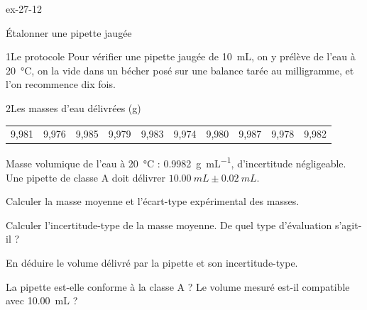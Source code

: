 \begin{blocLivre}{ex-27-12}
\begin{exercice}[3]{Étalonner une pipette jaugée}
\begin{docu}{1}{Le protocole}
Pour vérifier une pipette jaugée de \qty{10}{mL}, on y prélève de l'eau à \qty{20}{\degreeCelsius}, on la vide dans un bécher posé sur une
balance tarée au milligramme, et l'on recommence dix fois.
\end{docu}
\begin{docu}{2}{Les masses d'eau délivrées (g)}
\begin{tabular}{cccccccccc}
9,981 & 9,976 & 9,985 & 9,979 & 9,983 & 9,974 & 9,980 & 9,987 & 9,978 & 9,982 \\
\end{tabular}
\end{docu}
\begin{donnees}
Masse volumique de l'eau à \qty{20}{\degreeCelsius} : \qty{0,9982}{g.mL^{-1}}, d'incertitude négligeable. Une pipette de classe A doit délivrer
$\qty{10,00}{mL}\pm\qty{0,02}{mL}$.
\end{donnees}
\begin{questions}
\item Calculer la masse moyenne et l'écart-type expérimental des masses.
\item Calculer l'incertitude-type de la masse moyenne. De quel type d'évaluation s'agit-il ?
\item En déduire le volume délivré par la pipette et son incertitude-type.
\item \initiative La pipette est-elle conforme à la classe A ? Le volume mesuré est-il compatible avec \qty{10,00}{mL} ?
\end{questions}
\end{exercice}
\end{blocLivre}
